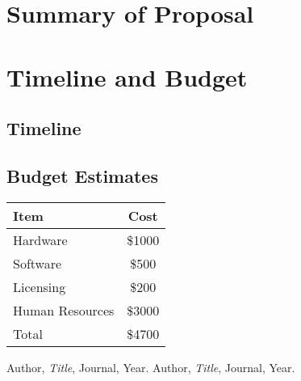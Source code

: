 \documentclass{report}
\begin{document}
\chapter{Summary of Proposal}
\lipsum[10]

\chapter{Timeline and Budget}
\section{Timeline}
\lipsum[11]
\section{Budget Estimates}
\begin{tabular}{|l|c|}
\hline
Item & Cost \\
\hline
Hardware & \$1000 \\
Software & \$500 \\
Licensing & \$200 \\
Human Resources & \$3000 \\
\hline
Total & \$4700 \\
\hline
\end{tabular}

\begin{thebibliography}{9}
 Author, \textit{Title}, Journal, Year.
 Author, \textit{Title}, Journal, Year.
\end{thebibliography}
\end{document}
